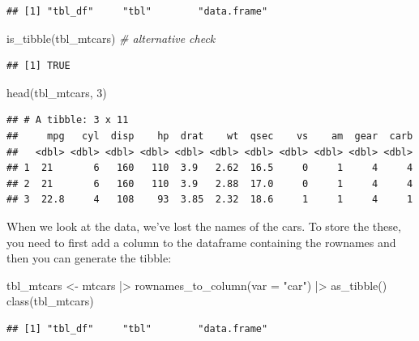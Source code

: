 \documentclass[
  12pt,
  oneside]{book}
\newenvironment{Shaded}{\begin{snugshade}}{\end{snugshade}}
\newcommand{\AttributeTok}[1]{\textcolor[rgb]{0.77,0.63,0.00}{#1}}
\newcommand{\CommentTok}[1]{\textcolor[rgb]{0.56,0.35,0.01}{\textit{#1}}}
\newcommand{\DecValTok}[1]{\textcolor[rgb]{0.00,0.00,0.81}{#1}}
\newcommand{\FunctionTok}[1]{\textcolor[rgb]{0.00,0.00,0.00}{#1}}
\newcommand{\NormalTok}[1]{#1}
\newcommand{\OtherTok}[1]{\textcolor[rgb]{0.56,0.35,0.01}{#1}}
\newcommand{\SpecialCharTok}[1]{\textcolor[rgb]{0.00,0.00,0.00}{#1}}
\newcommand{\StringTok}[1]{\textcolor[rgb]{0.31,0.60,0.02}{#1}}
\theoremstyle{definition}
\theoremstyle{definition}
\theoremstyle{definition}
\theoremstyle{definition}
\theoremstyle{remark}
\begin{document}
\begin{verbatim}
## [1] "tbl_df"     "tbl"        "data.frame"
\end{verbatim}

\begin{Shaded}
\begin{Highlighting}[]
\FunctionTok{is\_tibble}\NormalTok{(tbl\_mtcars) }\CommentTok{\# alternative check}
\end{Highlighting}
\end{Shaded}

\begin{verbatim}
## [1] TRUE
\end{verbatim}

\begin{Shaded}
\begin{Highlighting}[]
\FunctionTok{head}\NormalTok{(tbl\_mtcars, }\DecValTok{3}\NormalTok{)}
\end{Highlighting}
\end{Shaded}

\begin{verbatim}
## # A tibble: 3 x 11
##     mpg   cyl  disp    hp  drat    wt  qsec    vs    am  gear  carb
##   <dbl> <dbl> <dbl> <dbl> <dbl> <dbl> <dbl> <dbl> <dbl> <dbl> <dbl>
## 1  21       6   160   110  3.9   2.62  16.5     0     1     4     4
## 2  21       6   160   110  3.9   2.88  17.0     0     1     4     4
## 3  22.8     4   108    93  3.85  2.32  18.6     1     1     4     1
\end{verbatim}

When we look at the data, we've lost the names of the cars. To store the these, you need to first add a column to the dataframe containing the rownames and then you can generate the tibble:

\begin{Shaded}
\begin{Highlighting}[]
\NormalTok{tbl\_mtcars }\OtherTok{\textless{}{-}}\NormalTok{ mtcars }\SpecialCharTok{|\textgreater{}} 
  \FunctionTok{rownames\_to\_column}\NormalTok{(}\AttributeTok{var =} \StringTok{"car"}\NormalTok{) }\SpecialCharTok{|\textgreater{}}
  \FunctionTok{as\_tibble}\NormalTok{() }
\FunctionTok{class}\NormalTok{(tbl\_mtcars)}
\end{Highlighting}
\end{Shaded}

\begin{verbatim}
## [1] "tbl_df"     "tbl"        "data.frame"
\end{verbatim}
\end{document}
